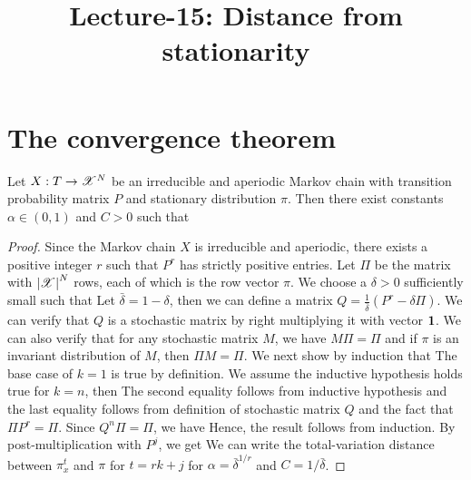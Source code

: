 \documentclass[letterpaper,english,10pt]{article}
\title{Lecture-15: Distance from stationarity}
\begin{document}
\maketitle

\section{The convergence theorem}
\begin{thm} 
Let $X: T \to \mathscr{X}^N$ be an irreducible and aperiodic Markov chain with transition probability matrix $P$ and stationary distribution $\pi$. 
Then there exist constants $\alpha \in (0,1)$ and $C > 0$ such that
\end{thm}
\begin{proof}
Since the Markov chain $X$ is irreducible and aperiodic, 
there exists a positive integer $r$ such that $P^r$ has strictly positive entries. 
Let $\Pi$ be the matrix with $\left\lvert\mathscr{X}\right\rvert^N$ rows, 
each of which is the row vector $\pi$. 
We choose a $\delta > 0$  sufficiently small such that 
Let $\bar{\delta} = 1-\delta$, then we can define a matrix $Q = \frac{1}{\bar{\delta}}(P^r- \delta\Pi)$. 
We can verify that $Q$ is a stochastic matrix by right multiplying it with vector $\mathbf{1}$. 
We can also verify that for any stochastic matrix $M$, we have $M\Pi = \Pi$ and if $\pi$ is an invariant distribution of $M$, then $\Pi M = \Pi$. 
We next show by induction that 
The base case of $k=1$ is true by definition. 
We assume the inductive hypothesis holds true for $k =n$,  then
The second equality follows from inductive hypothesis and the last equality follows from definition of stochastic matrix $Q$ and the fact that $\Pi P^r = \Pi$. 
Since $Q^n\Pi = \Pi$, we have 
Hence, the result follows from induction. 
By post-multiplication with $P^j$, we get 
We can write the total-variation distance between $\pi^{t}_x$ and $\pi$ for $t=rk+j$
for $\alpha = \bar{\delta}^{1/r}$ and $C = 1/\bar{\delta}$. 
\end{proof}
\end{document}
